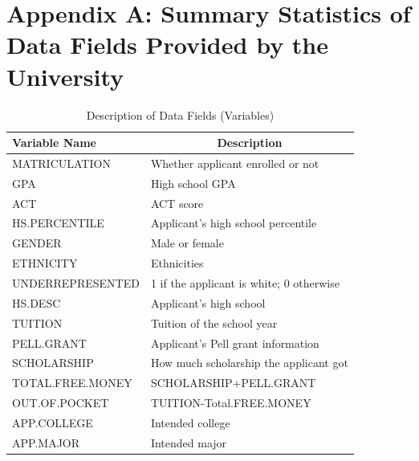 \documentclass[12pt,english]{report}
\begin{document}

\appendix
\chapter{Appendix A: Summary Statistics of Data Fields Provided by the University}  \label{app A}



\begin{table}[ht]
\centering
\caption{Description of Data Fields (Variables)}
\label{my-label}
\begin{tabular}{ll}
\hline
Variable Name     & \multicolumn{1}{c}{Description}      \\ \hline
MATRICULATION     & Whether applicant enrolled or not           	  \\
GPA               & High school GPA                                   \\
ACT               & ACT score                       					\\
HS.PERCENTILE     & Applicant's high school percentile         \\
GENDER            & Male or female                       \\
ETHNICITY         & Ethnicities                               \\
UNDERREPRESENTED  & 1 if the applicant is white; 0 otherwise       \\
HS.DESC           & Applicant's high school                       \\
TUITION           & Tuition of the school year                          \\
PELL.GRANT        & Applicant's Pell grant information       \\
SCHOLARSHIP       & How much scholarship the applicant got     \\
TOTAL.FREE.MONEY  & SCHOLARSHIP+PELL.GRANT                         \\
OUT.OF.POCKET     & TUITION-Total.FREE.MONEY              \\
APP.COLLEGE       & Intended college            \\
APP.MAJOR         & Intended major                \\ \hline
\end{tabular}
\end{table}
	
\end{document}

